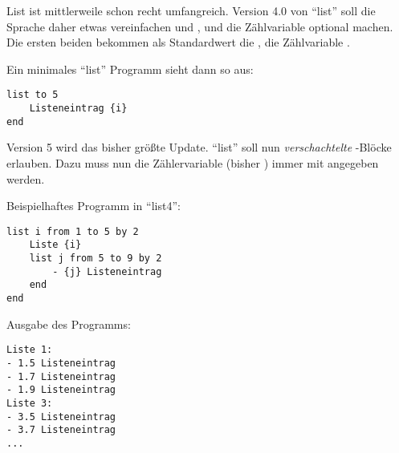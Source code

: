 \documentclass[fontsize=10pt, a4paper, ngerman]{scrartcl}
\begin{document}
\begin{aufgabe}[subtitle=list 4.0]
	\label{aufg:list-v4}
	List ist mittlerweile schon recht umfangreich. Version 4.0 von \enquote{list} soll die
	Sprache daher etwas vereinfachen und ,  und die Zählvariable
	optional machen. Die ersten beiden bekommen als Standardwert die , die Zählvariable
	.

	Ein minimales \enquote{list} Programm sieht dann so aus:
	\begin{verbatim}
list to 5
    Listeneintrag {i}
end
	\end{verbatim}
\end{aufgabe}

\begin{aufgabe}[subtitle=list 5.0]
	\label{aufg:list-v5}
	Version 5 wird das bisher größte Update. \enquote{list} soll nun \emph{verschachtelte}
	-Blöcke erlauben. Dazu muss nun die Zählervariable (bisher ) immer
	mit angegeben werden.

	\begin{minipage}[t]{.6\textwidth}
		Beispielhaftes Programm in \enquote{list4}:
		\begin{verbatim}
list i from 1 to 5 by 2
    Liste {i}
    list j from 5 to 9 by 2
        - {j} Listeneintrag
    end
end
		\end{verbatim}
		\end{minipage}\hfill\begin{minipage}[t]{.4\textwidth}
		Ausgabe des Programms:
		\begin{verbatim}
Liste 1:
- 1.5 Listeneintrag
- 1.7 Listeneintrag
- 1.9 Listeneintrag
Liste 3:
- 3.5 Listeneintrag
- 3.7 Listeneintrag
...
		\end{verbatim}
	\end{minipage}

\end{aufgabe}
\end{document}
